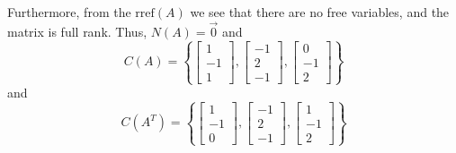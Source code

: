 \begin{mdframed}[style=MyFrame]
    Furthermore, from the $\text{rref}(A)$ we see that there are no free
    variables, and the matrix is full rank. Thus, $N(A) = \vec{0}$ and
    \begin{equation}
        C(A) =
        \left\{
            \begin{bmatrix}
                1   \\
                -1  \\
                1   
            \end{bmatrix}, 
            \begin{bmatrix}
                -1   \\
                2    \\
                -1   
            \end{bmatrix},
            \begin{bmatrix}
                0   \\
                -1  \\
                2   
            \end{bmatrix}
           \right\}
    \end{equation}
    and 
    \begin{equation}
        C\left(A^{T}\right) =
        \left\{
            \begin{bmatrix}
                1   \\
                -1  \\
                0   
            \end{bmatrix},
            \begin{bmatrix}
                -1   \\
                2    \\
                -1   
            \end{bmatrix},
            \begin{bmatrix}
                1   \\
                -1  \\
                2   
            \end{bmatrix}
           \right\}
    \end{equation}
\end{mdframed}
